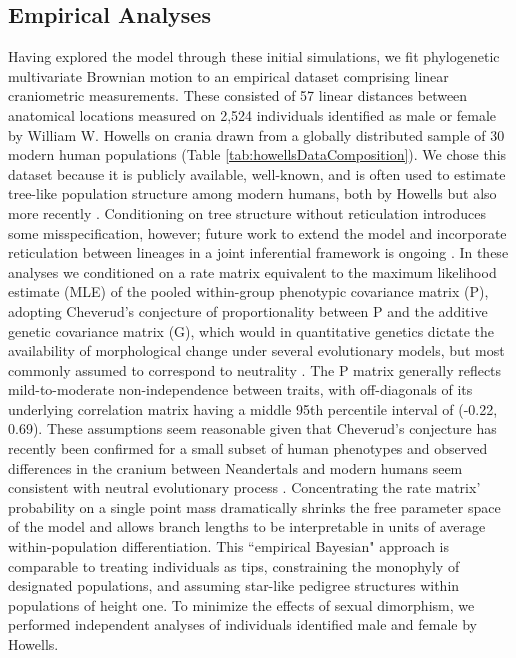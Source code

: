 \subsection{Empirical Analyses}

Having explored the model through these initial simulations, we fit phylogenetic multivariate Brownian motion to an empirical dataset comprising linear craniometric measurements. These consisted of 57 linear distances between anatomical locations measured on 2,524 individuals identified as male or female by William W. Howells \citeyear{howellsCranialVariationMan1973, howellsSkullShapesMap1989, howellsWhoWhoSkulls1995} on crania drawn from a globally distributed sample of 30 modern human populations (Table \ref{tab:howellsDataComposition}). We chose this dataset because it is publicly available, well-known, and is often used to estimate tree-like population structure among modern humans, both by Howells but also more recently \citep[e.g.][]{rosemanRandomGeneticDrift2016}. Conditioning on tree structure without reticulation introduces some misspecification, however; future work to extend the model and incorporate reticulation between lineages in a joint inferential framework is ongoing \citep[following e.g.][]{pickrellInferencePopulationSplits2012}. In these analyses we conditioned on a rate matrix equivalent to the maximum likelihood estimate (MLE) of the pooled within-group phenotypic covariance matrix (P), adopting Cheverud’s conjecture \citep{cheverudDevelopmentalIntegrationEvolution1996, roffEstimationGeneticCorrelations1995, reuschQuantitativeGeneticsDung1998, waittGeneticPhenotypicCorrelations1998, revellPhylogeneticApproachDetermining2007} of proportionality between P and the additive genetic covariance matrix (G), which would in quantitative genetics dictate the availability of morphological change under several evolutionary models, but most commonly assumed to correspond to neutrality \citep{landeNaturalSelectionRandom1976, landeQuantitativeGeneticAnalysis1979, felsensteinPhylogeniesQuantitativeCharacters1988a}. The P matrix generally reflects mild-to-moderate non-independence between traits, with off-diagonals of its underlying correlation matrix having a middle 95th percentile interval of (-0.22, 0.69). These assumptions seem reasonable given that Cheverud’s conjecture has recently been confirmed for a small subset of human phenotypes \citep{sodiniComparisonGenotypicPhenotypic2018} and observed differences in the cranium between Neandertals and modern humans seem consistent with neutral evolutionary process \citep{weaverWereNeandertalModern2007, weaverUnconstrainedCranialEvolution2015}. Concentrating the rate matrix’ probability on a single point mass dramatically shrinks the free parameter space of the model and allows branch lengths to be interpretable in units of average within-population differentiation. This ``empirical Bayesian" approach is comparable to treating individuals as tips, constraining the monophyly of designated populations, and assuming star-like pedigree structures within populations of height one. To minimize the effects of sexual dimorphism, we performed independent analyses of individuals identified male and female by Howells. 

